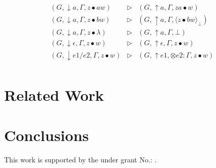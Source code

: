 \documentclass[manuscript, review, sigconf]{acmart}
\begin{document}
\[
\begin{array}{lcl}
 (G, \downarrow a,\Gamma ,z \bullet aw)       & \rhd & (G, \uparrow a, \Gamma, za \bullet w) \\
 (G, \downarrow a,\Gamma ,z \bullet bw)       & \rhd & (G, \uparrow a, \Gamma, \langle z \bullet bw\rangle_{\bot}) \\
 (G, \downarrow a,\Gamma ,z \bullet \lambda)  & \rhd & (G, \uparrow a, \Gamma, \bot) \\
 (G, \downarrow \epsilon,\Gamma ,z \bullet w) & \rhd & (G, \uparrow \epsilon, \Gamma, z \bullet w) \\
 (G, \downarrow e1/e2, \Gamma ,z \bullet w)   & \rhd & (G, \uparrow e1, \otimes e2 : \Gamma, z \bullet w) \\
\end{array}
\]

\section{Related Work} \label{sec:related}


\section{Conclusions} \label{sec:conc}


\begin{acks}
This work is supported by the  under grant No.: .
\end{acks}




\end{document}
